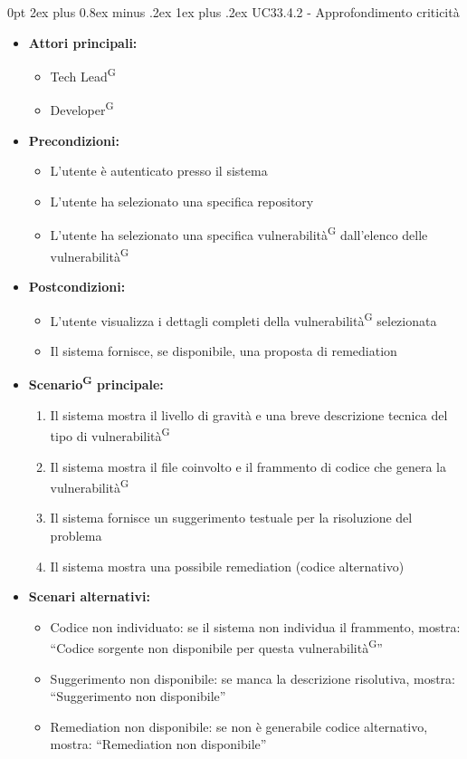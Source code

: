 \documentclass[a4paper, 11pt]{article}
\makeatletter
\renewcommand\subparagraph{\@startsection{subparagraph}{5}
  {0pt}
  {2ex plus 0.8ex minus .2ex}
  {1ex plus .2ex}
  {\normalfont\normalsize\bfseries\color{AccentColor}}}
\makeatother
\begin{document}
\subparagraph{UC33.4.2 - Approfondimento criticità}\label{UC33.4.2}
\begin{itemize}
    \item \textbf{Attori principali:} 
    \begin{itemize}
        \item Tech Lead\textsuperscript{G}
        \item Developer\textsuperscript{G}
    \end{itemize}
    \item \textbf{Precondizioni:} 
    \begin{itemize}
        \item L'utente è autenticato presso il sistema
        \item L’utente ha selezionato una specifica repository
        \item L'utente ha selezionato una specifica vulnerabilità\textsuperscript{G} dall'elenco delle vulnerabilità\textsuperscript{G}
    \end{itemize}
    \item \textbf{Postcondizioni:} 
    \begin{itemize}
        \item L’utente visualizza i dettagli completi della vulnerabilità\textsuperscript{G} selezionata
        \item Il sistema fornisce, se disponibile, una proposta di remediation
    \end{itemize}
    \item \textbf{Scenario\textsuperscript{G} principale:}
    \begin{enumerate}
        \item Il sistema mostra il livello di gravità e una breve descrizione tecnica del tipo di vulnerabilità\textsuperscript{G}
        \item Il sistema mostra il file coinvolto e il frammento di codice che genera la vulnerabilità\textsuperscript{G}
        \item Il sistema fornisce un suggerimento testuale per la risoluzione del problema
        \item Il sistema mostra una possibile remediation (codice alternativo)
    \end{enumerate}
    \item \textbf{Scenari alternativi:}
    \begin{itemize}
        \item Codice non individuato: se il sistema non individua il frammento, mostra: ``Codice sorgente non disponibile per questa vulnerabilità\textsuperscript{G}''
        \item Suggerimento non disponibile: se manca la descrizione risolutiva, mostra: ``Suggerimento non disponibile''
        \item Remediation non disponibile: se non è generabile codice alternativo, mostra: ``Remediation non disponibile''
    \end{itemize}
\end{itemize}
\end{document}
